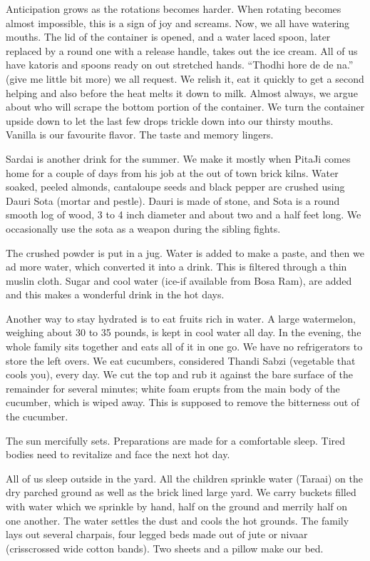 Anticipation grows as the rotations becomes harder. When rotating becomes
almost impossible, this is a sign of joy and screams. Now, we all have
watering mouths. The lid of the container is opened, and a water laced
spoon, later replaced by a round one with a release handle, takes out the
ice cream. All of us have katoris and spoons ready on out stretched hands.
“Thodhi hore de de na.” (give me little bit more) we all request. We
relish it, eat it quickly to get a second helping and also before the heat
melts it down to milk. Almost always, we argue about who will scrape the
bottom portion of the container. We turn the container upside down to let
the last few drops trickle down into our thirsty mouths. Vanilla is our
favourite flavor. The taste and memory lingers. 
 
Sardai is another drink for the summer. We make it mostly when PitaJi
comes home for a couple of days from his job at the out of town brick
kilns. Water soaked, peeled almonds, cantaloupe seeds and black pepper are
crushed using Dauri Sota (mortar and pestle). Dauri is made of stone, and
Sota is a round smooth log of wood, 3 to 4 inch diameter and about two and
a half feet long. We occasionally use the sota as a weapon during the
sibling fights. 

The crushed powder is put in a jug. Water is added to make a paste, and
then we ad more water, which converted it into a drink. This is filtered
through a thin muslin cloth. Sugar and cool water (ice-if available from
Bosa Ram), are added and this makes a wonderful drink in the hot days. 
 
Another way to stay hydrated is to eat fruits rich in water. A large
watermelon, weighing about 30 to 35 pounds, is kept in cool water all day.
In the evening, the whole family sits together and eats all of it in one
go. We have no refrigerators to store the left overs. We eat cucumbers,
considered Thandi Sabzi (vegetable that cools you), every day. We cut the
top and rub it against the bare surface of the remainder for several
minutes; white foam erupts from the main body of the cucumber, which is
wiped away. This is supposed to remove the bitterness out of the cucumber. 
 
The sun mercifully sets. Preparations are made for a comfortable sleep.
Tired bodies need to revitalize and face the next hot day. 

All of us sleep outside in the yard. All the children sprinkle water
(Taraai) on the dry parched ground as well as the brick lined large yard.
We carry buckets filled with water which we sprinkle by hand, half on the
ground and merrily half on one another. The water settles the dust and
cools the hot grounds. The family lays out several charpais, four legged
beds made out of jute or nivaar (crisscrossed wide cotton bands). Two
sheets and a pillow make our bed. 
 
